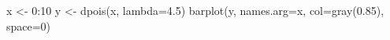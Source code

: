 \begin{Schunk}
\begin{Sinput}
 x <- 0:10
 y <- dpois(x, lambda=4.5)
 barplot(y, names.arg=x, col=gray(0.85), space=0)
\end{Sinput}
\end{Schunk}
